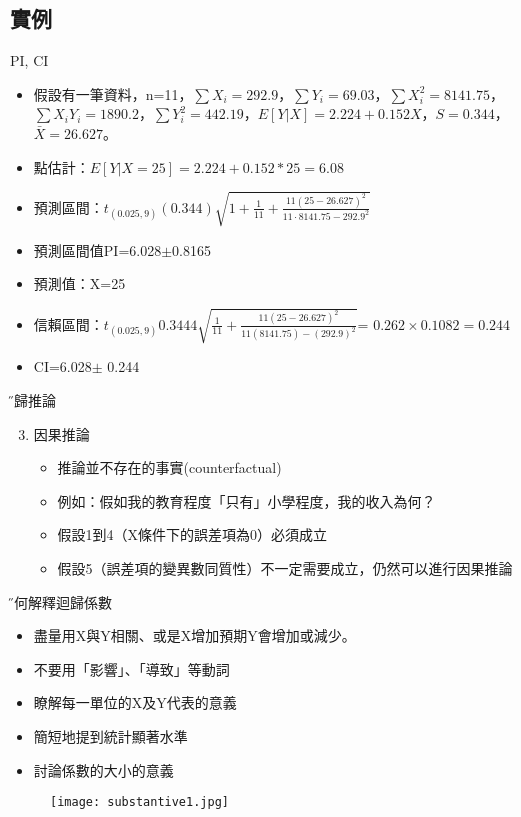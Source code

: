 \documentclass[xcolor=dvipsnames]{beamer}
\begin{document}
\subsection{實例}
\begin{frame}{PI, CI}
\begin{itemize}
\item 假設有一筆資料，n=11，$\sum X_{i}=292.9$，$\sum Y_{i}=69.03$，$\sum X_{i}^2=8141.75$，
$\sum X_{i}Y_{i}=1890.2$，$\sum Y_{i}^2=442.19$，$E[Y|X]=2.224+0.152X$，$S=0.344$，$\bar{X}=26.627$。
\item 點估計：$E[Y|X=25]=2.224+0.152*25=6.08$
\item 預測區間：$t_{(0.025, 9)}(0.344)\sqrt{1+\frac{1}{11}+\frac{11(25-26.627)^2}{11\cdot 8141.75-292.9^2}}$
\item 預測區間值PI=6.028$\pm$0.8165
\item 預測值：X=25
\item 信賴區間：$t_{(0.025, 9)}0.3444\sqrt{\frac{1}{11}+\frac{11(25-26.627)^2}{11(8141.75)-(292.9)^2}}$=
$0.262\times 0.1082=0.244$
\item CI=6.028$\pm$ 0.244
\end{itemize}
\end{frame}
\begin{frame}{\H 迴歸推論}
\begin{enumerate}
\setcounter{enumi}{2}
\item 因果推論
\begin{itemize}
\item 推論並不存在的事實(counterfactual)
\item 例如：假如我的教育程度「只有」小學程度，我的收入為何？
\item 假設1到4（X條件下的誤差項為0）必須成立 
\item 假設5（誤差項的變異數同質性）不一定需要成立，仍然可以進行因果推論
\end{itemize}
\end{enumerate}
\end{frame}
\begin{frame}{\H 如何解釋迴歸係數}
\begin{itemize}
\item 盡量用X與Y相關、或是X增加預期Y會增加或減少。
\item 不要用「影響」、「導致」等動詞
\item 瞭解每一單位的X及Y代表的意義
\item 簡短地提到統計顯著水準
\item 討論係數的大小的意義
\end{itemize}
\end{frame}
\begin{frame}
\begin{center}
\begin{figure}
\texttt{[image: substantive1.jpg]}
\end{figure}
\end{center}
\end{frame}
\end{document}
